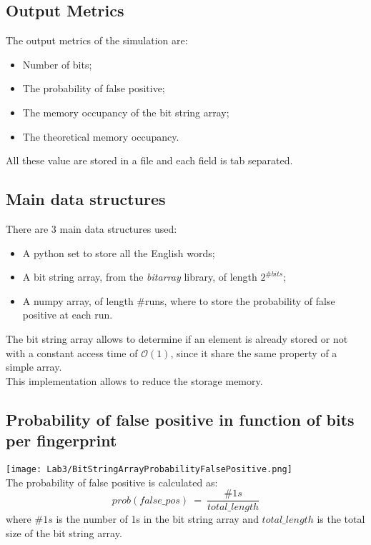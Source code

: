 \documentclass[twocolumn,letterpaper]{report}
\begin{document}
{				\subsection{Output Metrics}
				The output metrics of the simulation are:
				\begin{itemize}
					\item Number of bits;
					\item The probability of false positive;
					\item The memory occupancy of the bit string array;
					\item The theoretical memory occupancy.
				\end{itemize}
				All these value are stored in a file and each field is tab separated.
			
			\subsection{Main data structures}
						There are 3 main data structures used: 
							\begin{itemize}
								\item A python set to store all the English words;
								\item A bit string array,  from the \emph{bitarray} library, of length $2^{\#bits}$;
								\item A numpy array, of length \#runs, where to store the probability of false positive at each run.
							\end{itemize}
					The bit string array allows to determine if an element is already stored or not with a constant access time of $\mathcal{O}(1)$, since it share the same property of a simple array. \\
					This implementation allows to reduce the storage memory.
					
			\subsection{Probability of false positive in function of bits per fingerprint}
			\texttt{[image: Lab3/BitStringArrayProbabilityFalsePositive.png]} \\
			The probability of false positive is calculated as:
			\begin{equation}\label{eq:1}
						prob(false\_pos) \: = \: \frac{\#1s}{total\_length}
			\end{equation}
			where $\#1s$ is the number of 1s in the bit string array and $total\_length$ is the total size of the bit string array.
					
}
\end{document}
